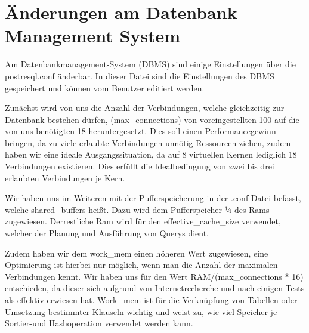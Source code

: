 \section{Änderungen am Datenbank Management System}

Am Datenbankmanagement-System (DBMS) sind einige Einstellungen über die postresql.conf änderbar. In 
dieser Datei sind die Einstellungen des DBMS gespeichert und können vom Benutzer editiert werden. 

Zunächst wird von uns die Anzahl der Verbindungen, welche gleichzeitig zur Datenbank bestehen 
dürfen, (max\_connections) von voreingestellten 100 auf die von uns benötigten 18 heruntergesetzt.
Dies soll einen Performancegewinn bringen, da zu viele erlaubte Verbindungen unnötig Ressourcen 
ziehen, zudem haben wir eine ideale Ausgangssituation, da auf 8 virtuellen Kernen lediglich 18 
Verbindungen existieren. Dies erfüllt die Idealbedingung von zwei bis drei erlaubten Verbindungen 
je Kern.

Wir haben uns im Weiteren mit der Pufferspeicherung in der .conf Datei befasst, welche 
shared\_buffers heißt. Dazu wird dem Pufferspeicher ¼ des Rams zugewiesen. Derrestliche Ram wird 
für den effective\_cache\_size verwendet, welcher der Planung und Ausführung von Querys dient.

Zudem haben wir dem work\_mem einen höheren Wert zugewiesen, eine Optimierung ist hierbei nur 
möglich, wenn man die Anzahl der maximalen Verbindungen kennt. Wir haben uns für den Wert 
RAM/(max\_connections * 16) entschieden, da dieser sich aufgrund von Internetrecherche und nach 
einigen Tests als effektiv erwiesen hat. Work\_mem ist für die Verknüpfung von Tabellen oder 
Umsetzung bestimmter Klauseln wichtig und weist zu, wie viel Speicher je Sortier-und Hashoperation 
verwendet werden kann.



\clearpage